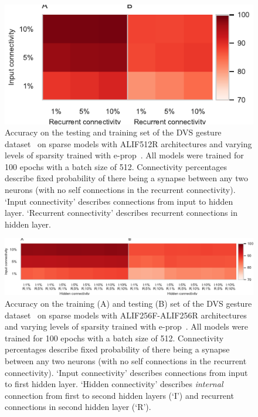 \documentclass[sigconf]{acmart}
\begin{document}
\begin{figure}[t]
  \centering
  \includegraphics{figures/sparse_accuracy.pdf}
  \caption{Accuracy on the testing and training set of the DVS gesture dataset~\citep{amir_low_2017} on sparse models with ALIF512R architectures and varying levels of sparsity trained with e-prop~\citep{Bellec2020}.
  All models were trained for 100 epochs with a batch size of 512.
  Connectivity percentages describe fixed probability of there being a synapse between any two neurons (with no self connections in the recurrent connectivity).
  `Input connectivity' describes connections from input to hidden layer.
  `Recurrent connectivity' describes recurrent connections in hidden layer.}
  \label{fig:sparse_accuracy}
\end{figure}

\begin{figure}[t]
  \centering
  \includegraphics{figures/two_layer_sparse_accuracy.pdf}
  \caption{Accuracy on the training (A) and testing (B) set of the DVS gesture dataset~\citep{amir_low_2017} on sparse models with ALIF256F-ALIF256R architectures and varying levels of sparsity trained with e-prop~\citep{Bellec2020}.
  All models were trained for 100 epochs with a batch size of 512.
  Connectivity percentages describe fixed probability of there being a synapse between any two neurons (with no self connections in the recurrent connectivity).
  `Input connectivity' describes connections from input to first hidden layer.
  `Hidden connectivity' describes \emph{internal} connection from first to second hidden layers (`I') and recurrent connections in second hidden layer (`R').}
  \label{fig:two_layer_sparse_accuracy}
\end{figure}
\end{document}
